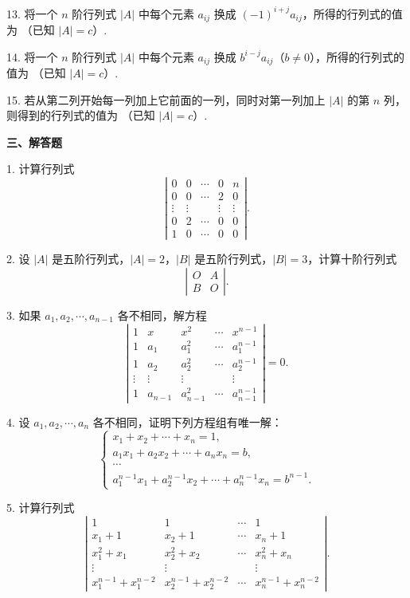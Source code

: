 \documentclass[UTF8, 12pt, fontset=fandol, oneside]{ctexart}
\begin{document}
13. 将一个 $n$ 阶行列式 $|A|$ 中每个元素 $a_{ij}$ 换成 $(-1)^{i+j}a_{ij}$，所得的行列式的值为
\underline{\hspace{3em}}（已知 $|A|=c$）.

14. 将一个 $n$ 阶行列式 $|A|$ 中每个元素 $a_{ij}$ 换成 $b^{i-j}a_{ij}$（$b\ne0$），所得的行列式的值为
\underline{\hspace{3em}}（已知 $|A|=c$）.

15. 若从第二列开始每一列加上它前面的一列，同时对第一列加上 $|A|$ 的第 $n$ 列，则得到的行列式的值为
\underline{\hspace{3em}}（已知 $|A|=c$）.

\noindent\textbf{三、解答题}

1. 计算行列式
\[
\left|\begin{array}{ccccc}
0&0&\cdots&0&n\\
0&0&\cdots&2&0\\
\vdots&\vdots&&\vdots&\vdots\\
0&2&\cdots&0&0\\
1&0&\cdots&0&0
\end{array}\right|.
\]

2. 设 $|A|$ 是五阶行列式，$|A|=2$，$|B|$ 是五阶行列式，$|B|=3$，计算十阶行列式
\[
\left|\begin{array}{cc}
O&A\\
B&O
\end{array}\right|.
\]

3. 如果 $a_1,a_2,\cdots,a_{n-1}$ 各不相同，解方程
\[
\left|\begin{array}{ccccc}
1&x&x^2&\cdots&x^{n-1}\\
1&a_1&a_1^2&\cdots&a_1^{n-1}\\
1&a_2&a_2^2&\cdots&a_2^{n-1}\\
\vdots&\vdots&\vdots&&\vdots\\
1&a_{n-1}&a_{n-1}^2&\cdots&a_{n-1}^{n-1}
\end{array}\right|=0.
\]

4. 设 $a_1,a_2,\cdots,a_n$ 各不相同，证明下列方程组有唯一解：
\[
\left\{\begin{array}{l}
x_1+x_2+\cdots+x_n=1,\\
a_1x_1+a_2x_2+\cdots+a_nx_n=b,\\
\cdots\\
a_1^{n-1}x_1+a_2^{n-1}x_2+\cdots+a_n^{n-1}x_n=b^{n-1}.
\end{array}\right.
\]

5. 计算行列式
\[
\left|\begin{array}{cccc}
1&1&\cdots&1\\
x_1+1&x_2+1&\cdots&x_n+1\\
x_1^2+x_1&x_2^2+x_2&\cdots&x_n^2+x_n\\
\vdots&\vdots&&\vdots\\
x_1^{n-1}+x_1^{n-2}&x_2^{n-1}+x_2^{n-2}&\cdots&x_n^{n-1}+x_n^{n-2}
\end{array}\right|.
\]
\end{document}
